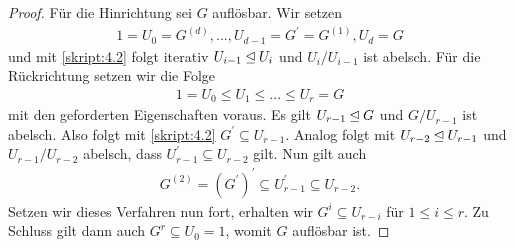 \begin{proof}
	Für die Hinrichtung sei $ G $ auflösbar. Wir setzen
	\begin{align*}
	1 = U_0 = G^{(d)},...,U_{d-1}= G^\prime = G^{(1)},U_d = G
	\end{align*}
	und mit \ref{skript:4.2} folgt iterativ $ U_{i-1} \unlhd U_{i} $ und $ U_{i} / U_{i-1} $ ist abelsch.
	Für die Rückrichtung setzen wir die Folge
	\begin{align*}
	1 = U_0 \leq U_1\leq ... \leq U_r = G
	\end{align*}
	mit den geforderten Eigenschaften voraus. Es gilt $ U_{r-1} \unlhd G $ und $ G/ U_{r-1} $ ist abelsch. Also folgt mit \ref{skript:4.2} $ G^\prime \subseteq U_{r-1} $. Analog folgt mit $ U_{r-2} \unlhd U_{r-1} $ und $ U_{r-1} /U_{r-2} $ abelsch, dass $ U_{r-1}^\prime \subseteq U_{r-2} $ gilt. Nun gilt auch 
	\begin{align*}
	G^{(2)} = (G^\prime)^\prime \subseteq U_{r-1}^\prime \subseteq U_{r-2}.
	\end{align*}
	Setzen wir dieses Verfahren nun fort, erhalten wir $ G^{i} \subseteq U_{r-i} $ für $ 1 \leq i \leq r $. 
	Zu Schluss gilt dann auch $ G^{r} \subseteq U_0  = 1 $, womit $ G $ auflösbar ist.
\end{proof}

